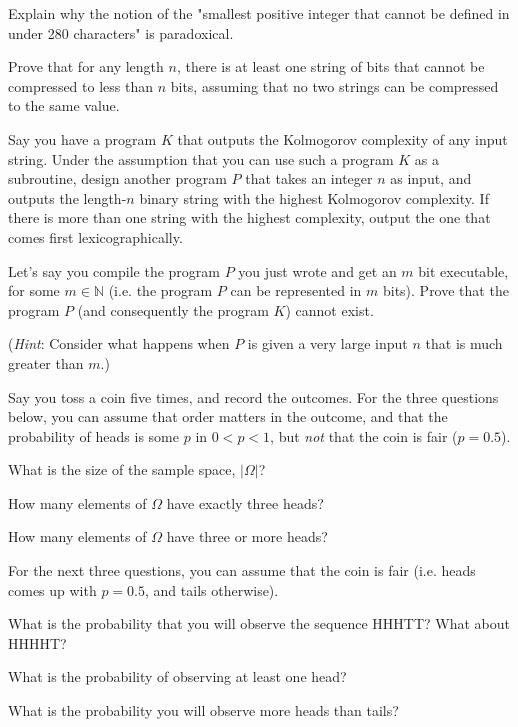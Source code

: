\documentclass[11pt]{article}
\begin{document}
\begin{Parts}

\Part
Explain why the notion of the "smallest positive integer that cannot be defined in under 280 characters" is paradoxical.

\Part
Prove that for any length $n$, there is at least one string of bits that cannot be compressed to less than $n$ bits, assuming that no two strings can be compressed to the same value.

\Part
Say you have a program $K$ that outputs the Kolmogorov complexity of any input
string. Under the assumption that you can use such a program $K$ as a
subroutine, design another program $P$ that takes an integer $n$ as input, and
outputs the length-$n$ binary string with the highest Kolmogorov complexity. If
there is more than one string with the highest complexity, output the one that
comes first lexicographically.

\Part
Let's say you compile the program $P$ you just wrote and get an $m$ bit
executable, for some $m \in \mathbb N$ (i.e. the program $P$ can be represented
in $m$ bits). Prove that the program $P$ (and consequently the program $K$)
cannot exist.

(\textit{Hint}: Consider what happens when $P$ is given a very large input $n$ that is much greater than $m$.)

 

\end{Parts}


Say you toss a coin five times, and record the outcomes. For the three questions
below, you can assume that order matters in the outcome, and that the
probability of heads is some $p$ in $0 < p < 1$, but \textit{not} that the coin
is fair ($p = 0.5$).

\begin{Parts}
\Part What is the size of the sample space, $|\Omega|$?

\Part How many elements of $\Omega$ have exactly three heads?

\Part How many elements of $\Omega$ have three or more heads?
\end{Parts}

For the next three questions, you can assume that the coin is fair (i.e. heads comes up with $p=0.5$, and tails otherwise).

\begin{Parts}[resume]
\Part What is the probability that you will observe the sequence HHHTT? What about HHHHT?

\Part What is the probability of observing at least one head?

\Part What is the probability you will observe more heads than tails?

\end{Parts}
\end{document}
